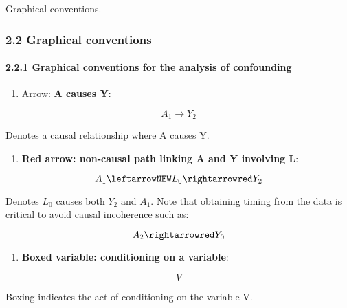 \documentclass[
  singlecolumn]{article}
\let\oldparagraph\paragraph
\renewcommand{\paragraph}[1]{\oldparagraph{#1}\mbox{}}
\providecommand{\tightlist}{%
  \setlength{\itemsep}{0pt}\setlength{\parskip}{0pt}}\usepackage{longtable,booktabs,array}
\begin{document}
\begin{table}

\caption{\label{tbl-conventionsgraph}Graphical conventions.}

\centering{

\terminologylocalconventions 

}

\end{table}%

\subsubsection{2.2 Graphical conventions}\label{graphical-conventions}

\paragraph{2.2.1 Graphical conventions for the analysis of
confounding}\label{graphical-conventions-for-the-analysis-of-confounding}

\begin{enumerate}
\def\labelenumi{\arabic{enumi}.}
\tightlist
\item
  Arrow: \textbf{A causes Y}:
\end{enumerate}

\[A_1 \rightarrow Y_2\]

Denotes a causal relationship where A causes Y.

\begin{enumerate}
\def\labelenumi{\arabic{enumi}.}
\setcounter{enumi}{1}
\tightlist
\item
  \textbf{Red arrow: non-causal path linking A and Y involving L}:
\end{enumerate}

\[ A_1 \leftarrowNEW L_0 \rightarrowred Y_2 \]

Denotes \(L_0\) causes both \(Y_2\) and \(A_1\). Note that obtaining
timing from the data is critical to avoid causal incoherence such as:

\[ A_2 \rightarrowred Y_0 \]

\begin{enumerate}
\def\labelenumi{\arabic{enumi}.}
\setcounter{enumi}{2}
\tightlist
\item
  \textbf{Boxed variable: conditioning on a variable}:
\end{enumerate}

\[ \boxed{V} \]

Boxing indicates the act of conditioning on the variable V.
\end{document}
